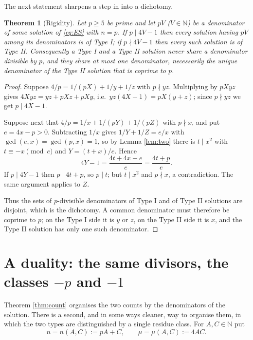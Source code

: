 \documentclass[11pt,reqno]{amsart}
\theoremstyle{plain}
\newtheorem{theorem}{Theorem}[section]
\theoremstyle{definition}
\numberwithin{equation}{section}
\newcommand{\N}{\mathbb{N}}
\begin{document}
The next statement sharpens a step in \cite[Lemma 4]{Bradford1} into a dichotomy.

\begin{theorem}[Rigidity]\label{thm:rigidity}
Let $p\ge5$ be prime and let $pV$ ($V\in\N$) be a denominator of some solution of
\eqref{eq:ES} with $n=p$. If $p\mid4V-1$ then every solution having $pV$ among its
denominators is of Type I; if $p\nmid4V-1$ then every such solution is of Type II.
Consequently a Type I and a Type II solution never share a denominator divisible by
$p$, and they share at most one denominator, necessarily the unique denominator of the
Type II solution that is coprime to $p$.
\end{theorem}

\begin{proof}
Suppose $4/p=1/(pX)+1/y+1/z$ with $p\nmid yz$. Multiplying by $pXyz$ gives
$4Xyz=yz+pXz+pXy$, i.e.\ $yz(4X-1)=pX(y+z)$; since $p\nmid yz$ we get $p\mid4X-1$.

Suppose next that $4/p=1/x+1/(pY)+1/(pZ)$ with $p\nmid x$, and put $e=4x-p>0$.
Subtracting $1/x$ gives $1/Y+1/Z=e/x$ with $\gcd(e,x)=\gcd(p,x)=1$, so by Lemma
\ref{lem:two} there is $t\mid x^{2}$ with $t\equiv-x\pmod e$ and $Y=(t+x)/e$. Hence
\[
  4Y-1=\frac{4t+4x-e}{e}=\frac{4t+p}{e}.
\]
If $p\mid4Y-1$ then $p\mid 4t+p$, so $p\mid t$; but $t\mid x^{2}$ and $p\nmid x$, a
contradiction. The same argument applies to $Z$.

Thus the sets of $p$-divisible denominators of Type I and of Type II solutions are
disjoint, which is the dichotomy. A common denominator must therefore be coprime to
$p$; on the Type I side it is $y$ or $z$, on the Type II side it is $x$, and the
Type II solution has only one such denominator.
\end{proof}

\section{A duality: the same divisors, the classes $-p$ and $-1$}\label{sec:duality}

Theorem \ref{thm:count} organises the two counts by the denominators of the solution.
There is a second, and in some ways cleaner, way to organise them, in which the two
types are distinguished by a single residue class. For $A,C\in\N$ put
\begin{equation}\label{eq:nm}
  n=n(A,C):=pA+C,\qquad \mu=\mu(A,C):=4AC .
\end{equation}
\end{document}
